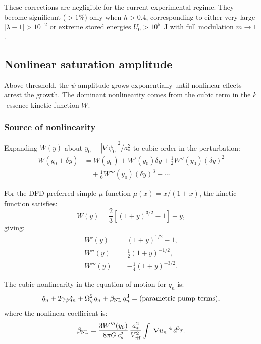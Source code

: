 \documentclass[12pt,aps,prd,twocolumn,superscriptaddress,nofootinbib]{revtex4-2}
\newcommand{\Opsi}{\Omega_\psi}
\newcommand{\gpsi}{\gamma_\psi}
\newcommand{\half}{\tfrac{1}{2}}
\begin{document}
These corrections are negligible for the current experimental regime.
They become significant ($>1\%$) only when $h > 0.4$, corresponding
to either very large $|\lambda-1| > 10^{-2}$ or extreme stored
energies $U_0 > 10^5$~J with full modulation $m \to 1$.

\subsection{Nonlinear saturation amplitude}
\label{sec:saturation}

Above threshold, the $\psi$ amplitude grows exponentially until
nonlinear effects arrest the growth.  The dominant nonlinearity
comes from the cubic term in the $k$-essence kinetic function $W$.

\subsubsection{Source of nonlinearity}

Expanding $W(y)$ about $y_0 = |\nabla\psi_0|^2/a_*^2$ to
cubic order in the perturbation:
\begin{align}
W(y_0 + \delta y) &= W(y_0) + W'(y_0)\delta y + \half W''(y_0)(\delta y)^2
\nonumber\\
&\quad + \frac{1}{6}W'''(y_0)(\delta y)^3 + \cdots
\label{eq:W_expand}
\end{align}

For the DFD-preferred simple $\mu$ function $\mu(x) = x/(1+x)$,
the kinetic function satisfies:
\begin{equation}
W(y) = \frac{2}{3}\left[(1+y)^{3/2} - 1\right] - y,
\label{eq:W_simple}
\end{equation}
giving:
\begin{align}
W'(y) &= (1+y)^{1/2} - 1, \label{eq:Wp}\\
W''(y) &= \frac{1}{2}(1+y)^{-1/2}, \label{eq:Wpp}\\
W'''(y) &= -\frac{1}{4}(1+y)^{-3/2}. \label{eq:Wppp}
\end{align}

The cubic nonlinearity in the equation of motion for $q_n$ is:
\begin{equation}
\ddot{q}_n + 2\gpsi\dot{q}_n + \Opsi^2 q_n + \beta_{\rm NL}\,q_n^3
= (\text{parametric pump terms}),
\label{eq:cubic_eom}
\end{equation}
where the nonlinear coefficient is:
\begin{equation}
\beta_{\rm NL} = \frac{3W'''(y_0)}{8\pi G\,c_s^2}\,
\frac{a_*^2}{V_{\rm eff}^2}\int |\nabla u_n|^4\,d^3r.
\label{eq:beta_NL}
\end{equation}
\end{document}
